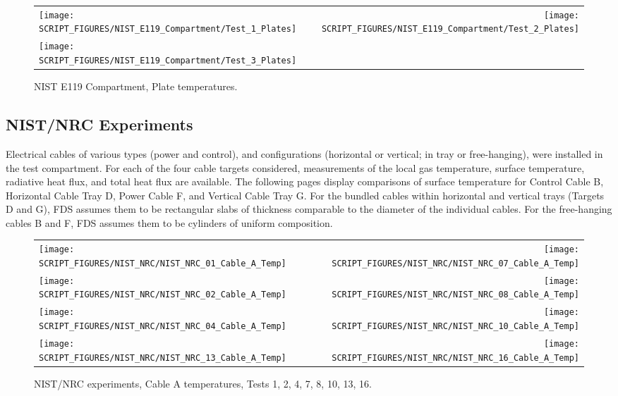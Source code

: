 \begin{figure}[!h]
\begin{tabular*}{\textwidth}{l@{\extracolsep{\fill}}r}
\texttt{[image: SCRIPT\_FIGURES/NIST\_E119\_Compartment/Test\_1\_Plates]} &
\texttt{[image: SCRIPT\_FIGURES/NIST\_E119\_Compartment/Test\_2\_Plates]} \\
\texttt{[image: SCRIPT\_FIGURES/NIST\_E119\_Compartment/Test\_3\_Plates]}
\end{tabular*}
\caption[NIST E119 Compartment, Plate temperatures]{NIST E119 Compartment, Plate temperatures.}
\label{NIST_E119_Compartment_Plates}
\end{figure}

\clearpage

\subsection{NIST/NRC Experiments}

Electrical cables of various types (power and control), and configurations (horizontal or vertical; in tray or free-hanging), were installed in the test compartment. For each of the four cable targets considered, measurements of the local gas temperature, surface temperature, radiative heat flux, and total heat flux are available.  The following pages display comparisons of surface temperature for Control Cable B, Horizontal Cable Tray D, Power Cable F, and Vertical Cable Tray G. For the bundled cables within horizontal and vertical trays (Targets D and G), FDS assumes them to be rectangular slabs of thickness comparable to the diameter of the individual cables. For the free-hanging cables B and F, FDS assumes them to be cylinders of uniform composition.

\newpage

\begin{figure}[p]
\begin{tabular*}{\textwidth}{l@{\extracolsep{\fill}}r}
\texttt{[image: SCRIPT\_FIGURES/NIST\_NRC/NIST\_NRC\_01\_Cable\_A\_Temp]} &
\texttt{[image: SCRIPT\_FIGURES/NIST\_NRC/NIST\_NRC\_07\_Cable\_A\_Temp]} \\
\texttt{[image: SCRIPT\_FIGURES/NIST\_NRC/NIST\_NRC\_02\_Cable\_A\_Temp]} &
\texttt{[image: SCRIPT\_FIGURES/NIST\_NRC/NIST\_NRC\_08\_Cable\_A\_Temp]} \\
\texttt{[image: SCRIPT\_FIGURES/NIST\_NRC/NIST\_NRC\_04\_Cable\_A\_Temp]} &
\texttt{[image: SCRIPT\_FIGURES/NIST\_NRC/NIST\_NRC\_10\_Cable\_A\_Temp]} \\
\texttt{[image: SCRIPT\_FIGURES/NIST\_NRC/NIST\_NRC\_13\_Cable\_A\_Temp]} &
\texttt{[image: SCRIPT\_FIGURES/NIST\_NRC/NIST\_NRC\_16\_Cable\_A\_Temp]}
\end{tabular*}
\caption[NIST/NRC experiments, Cable A temperatures, Tests 1, 2, 4, 7, 8, 10, 13, 16]{NIST/NRC experiments, Cable A temperatures, Tests 1, 2, 4, 7, 8, 10, 13, 16.}
\label{NIST_NRC_Cable_A_Closed}
\end{figure}

